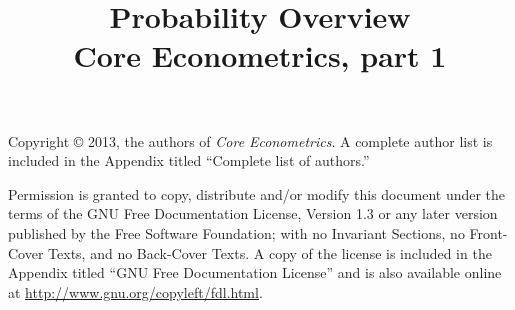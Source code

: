 \documentclass[nohyper]{tufte-handout}
\title[Probability overview]%
{Probability Overview \\
  Core Econometrics, part 1}
\begin{document}
\maketitle

\bigskip\noindent%
Copyright © 2013, the authors of \textit{Core Econometrics}.  A
complete author list is included in the Appendix titled ``Complete
list of authors.''

Permission is granted to copy, distribute and/or modify this document
under the terms of the GNU Free Documentation License, Version 1.3 or
any later version published by the Free Software Foundation; with no
Invariant Sections, no Front-Cover Texts, and no Back-Cover Texts.  A
copy of the license is included in the Appendix titled ``GNU Free
Documentation License'' and is also available online at
\url{http://www.gnu.org/copyleft/fdl.html}.

\tableofcontents
\listoftables
\listoffigures






\end{document}
